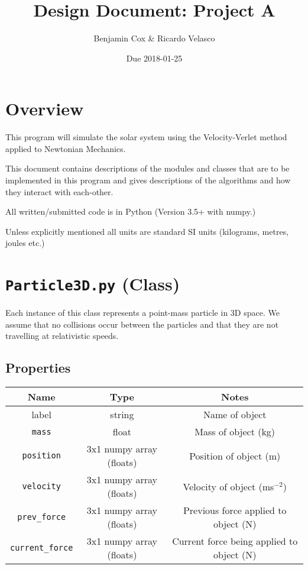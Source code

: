 \documentclass[a4paper, 11pt, british, left=1in, right=1in, top=0.3in, bottom=1in]{article}
\author{Benjamin Cox \& Ricardo Velasco}
\title{Design Document: Project A}
\date{Due 2018-01-25}
\begin{document}
	{\maketitle}
	
	\begingroup
	\tableofcontents
	\endgroup
	
	\pagebreak
	\section{Overview}
	
	This program will simulate the solar system using the Velocity-Verlet method applied to Newtonian Mechanics. 
	
	This document contains descriptions of the modules and classes that are to be implemented in this program and gives descriptions of the algorithms and how they interact with each-other. 
	
	All written/submitted code is in Python (Version 3.5+ with numpy.)
	
	Unless explicitly mentioned all units are standard SI units (kilograms, metres, joules etc.)
	\pagebreak
	
	\section{\texttt{Particle3D.py} (Class)}
	
	Each instance of this class represents a point-mass particle in 3D space. We assume that no collisions occur between the particles and that they are not travelling at relativistic speeds. 
	
	\subsection{Properties}
	\begin{center}
	\begin{tabular}{|c|c|c|}
		\rowcolor{NavyBlue}
		\hline
		\textbf{Name} & \textbf{Type} & \textbf{Notes} \\ 
		\hline label & string & Name of object \\ 
		\texttt{mass} & float & Mass of object (kg) \\ 
		\texttt{position} & 3x1 numpy array (floats) & Position of object (m) \\ 
	\texttt{velocity} & 3x1 numpy array (floats) & Velocity of object (ms$^{-2}$) \\ 
		\texttt{prev\_force} & 3x1 numpy array (floats) & Previous force applied to object (N) \\ 
		\texttt{current\_force} & 3x1 numpy array (floats) & Current force being applied to object (N) \\ 
		\hline
	\end{tabular} 
	\end{center}
	
\end{document}
